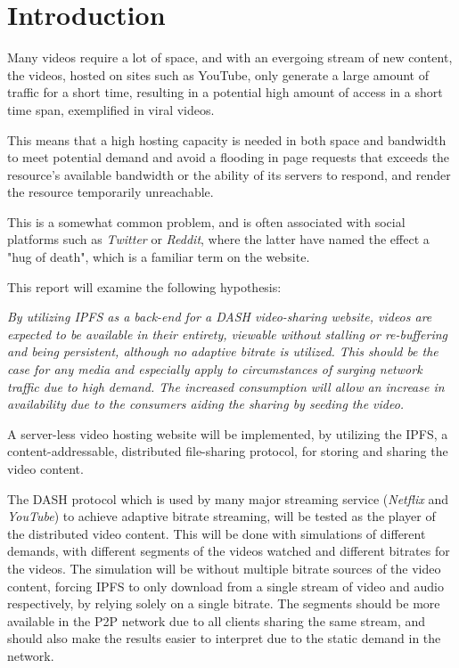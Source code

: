 \chapter{Introduction}
\label{cha:introduction}
Many videos require a lot of space, and with an evergoing stream of new content, the videos, hosted on sites such as YouTube, only generate a large amount of traffic for a short time, resulting in a potential high amount of access in a short time span, exemplified in viral videos. 

This means that a high hosting capacity is needed in both space and bandwidth to meet potential demand and avoid a flooding in page requests that exceeds the resource's available bandwidth or the ability of its servers to respond, and render the resource temporarily unreachable.

This is a somewhat common problem, and is often associated with social platforms such as \textit{Twitter} or \textit{Reddit}, where the latter have named the effect a "hug of death", which is a familiar term on the website.

\vspace{0.8cm}
\noindent This report will examine the following hypothesis:

\begin{displayquote}
    \textit{
        By utilizing \ac{IPFS} as a back-end for a \ac{DASH} video-sharing website, videos are expected to be available in their entirety, viewable without stalling or re-buffering and being persistent, although no adaptive bitrate is utilized.
        This should be the case for any media and especially apply to circumstances of surging network traffic due to high demand. The increased consumption will allow an increase in availability due to the consumers aiding the sharing by seeding the video.
    }
\end{displayquote}
\vspace{0.5cm}

A server-less video hosting website will be implemented, by utilizing the \ac{IPFS}, a content-addressable, distributed file-sharing protocol, for storing and sharing the video content.

The \ac{DASH} protocol which is used by many major streaming service (\eg \textit{Netflix} and \textit{YouTube}) to achieve adaptive bitrate streaming, will be tested as the player of the distributed video content. This will be done with simulations of different demands, with different segments of the videos watched and different bitrates for the videos. The simulation will be without multiple bitrate sources of the video content, forcing \ac{IPFS} to only download from a single stream of video and audio respectively, by relying solely on a single bitrate. The segments should be more available in the \ac{P2P} network due to all clients sharing the same stream, and should also make the results easier to interpret due to the static demand in the network.

